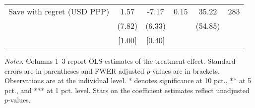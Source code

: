 \begin{table}[h]
{\begin{threeparttable}
\begin{tabular}{l*{5}{c}}
Save with regret (USD PPP)&     1.57&    -7.17&     0.15&    35.22&      283\\
          &   (7.82)&   (6.33)&         &  (54.85)&         \\
          &   [1.00]&   [0.40]&         &         &         \\
\bottomrule \end{tabular} \begin{tablenotes}[flushleft] \footnotesize \item \emph{Notes:} Columns 1--3 report OLS estimates of the treatment effect. Standard errors are in parentheses and FWER adjusted \(p\)-values are in brackets. Observations are at the individual level. * denotes significance at 10 pct., ** at 5 pct., and *** at 1 pct. level. Stars on the coefficient estimates reflect unadjusted \(p\)-values. \end{tablenotes} \end{threeparttable} } \end{table}


